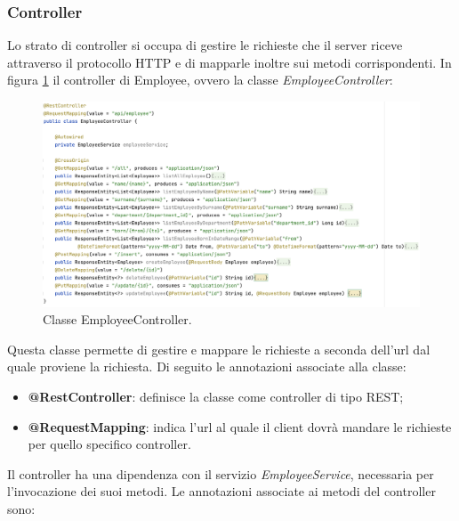 \subsubsection*{Controller}
Lo strato di controller si occupa di gestire le richieste che il server riceve attraverso il protocollo HTTP e di mapparle inoltre sui metodi corrispondenti. In figura \ref{employeeController} il controller di Employee, ovvero la classe \textit{EmployeeController}:
\FloatBarrier
\begin{figure}[!ht]
\begin{mdframed}
\centering
\includegraphics[width=1\linewidth]{immagini/EmployeeController.png}
\end{mdframed}
\caption{Classe EmployeeController.}
\label{employeeController}
\end{figure}
\FloatBarrier
Questa classe permette di gestire e mappare le richieste a seconda dell'url dal quale proviene la richiesta. Di seguito le annotazioni associate alla classe:
\begin{itemize}
  \item \textbf{@RestController}: definisce la classe come controller di tipo REST;
  \item \textbf{@RequestMapping}: indica l'url al quale il client dovrà mandare le richieste per quello specifico controller.
\end{itemize}
Il controller ha una dipendenza con il servizio \textit{EmployeeService}, necessaria per l'invocazione dei suoi metodi. Le annotazioni associate ai metodi del controller sono:
